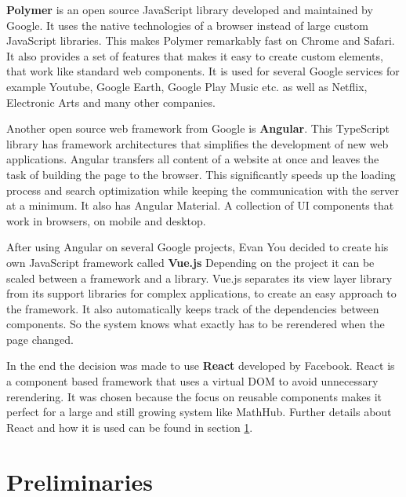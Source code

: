 \documentclass[11pt,a4paper]{article}
\begin{document}
\textbf{Polymer} \cite{polymer} is an open source JavaScript library developed and maintained by Google.
It uses the native technologies of a browser instead of large custom JavaScript libraries.
This makes Polymer remarkably fast on Chrome and Safari.
It also provides a set of features that makes it easy to create custom elements, that work like standard web components.
It is used for several Google services for example Youtube, Google Earth, Google Play Music etc. as well as Netflix, Electronic Arts and many other companies. 

Another open source web framework from Google is \textbf{Angular}. \cite{angular}
This TypeScript library has framework architectures that simplifies the development of new web applications.
Angular transfers all content of a website at once and leaves the task of building the page to the browser.
This significantly speeds up the loading process and search optimization while keeping the communication with the server at a minimum. 
It also has Angular Material.
A collection of UI components that work in browsers, on mobile and desktop.

After using Angular on several Google projects, Evan You decided to create his own JavaScript framework called \textbf{Vue.js} \cite{vuewiki}
Depending on the project it can be scaled between a framework and a library.
Vue.js separates its view layer library from its support libraries for complex applications, to create an easy approach to the framework.
It also automatically keeps track of the dependencies between components.
So the system knows what exactly has to be rerendered when the page changed.\cite{vuegit}

In the end the decision was made to use \textbf{React} developed by Facebook.
React is a component based framework that uses a virtual DOM to avoid unnecessary rerendering.
It was chosen because the focus on reusable components makes it perfect for a large and still growing system like MathHub.
Further details about React and how it is used can be found in section \ref{preliminaries}.


\section{Preliminaries} \label{preliminaries}
\end{document}
